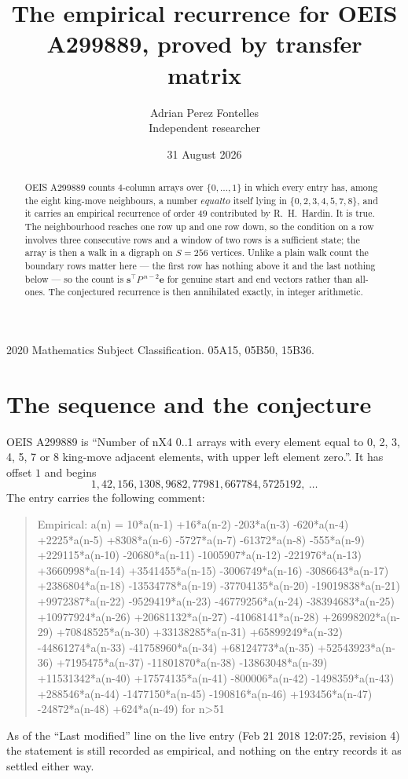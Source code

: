 \documentclass[11pt,a4paper]{article}
\title{The empirical recurrence for OEIS A299889, proved by transfer matrix}
\author{Adrian Perez Fontelles\\ \small Independent researcher}
\date{31 August 2026}
\theoremstyle{plain}
\theoremstyle{definition}
\begin{document}
\maketitle

\begin{abstract}
OEIS A299889 counts $4$-column arrays over $\{0,\dots,1\}$ in which every entry has,
among the eight king-move neighbours, a number $equal to$ itself lying in $\{0,2,3,4,5,7,8\}$, and it carries an empirical
recurrence of order $49$ contributed by R.~H.~Hardin. It is true. The neighbourhood
reaches one row up and one row down, so the condition on a row involves three consecutive
rows and a window of two rows is a sufficient state; the array is then a walk in a digraph
on $S=256$ vertices. Unlike a plain walk count the boundary rows matter here --- the first
row has nothing above it and the last nothing below --- so the count is
$\mathbf{s}^{\!\top}P^{\,n-2}\mathbf{e}$ for genuine start and end vectors rather than
all-ones. The conjectured recurrence is then annihilated exactly, in integer arithmetic.
\end{abstract}

\noindent\small 2020 Mathematics Subject Classification. 05A15, 05B50, 15B36.\normalsize

\section{The sequence and the conjecture}

OEIS A299889 is ``Number of nX4 0..1 arrays with every element equal to 0, 2, 3, 4, 5, 7 or 8 king-move adjacent elements, with upper left element zero.''. It has offset
$1$ and begins
\[
1, 42, 156, 1308, 9682, 77981, 667784, 5725192,\ \dots
\]
The entry carries the following comment:
\begin{quote}\small
Empirical: a(n) = 10*a(n-1) +16*a(n-2) -203*a(n-3) -620*a(n-4) +2225*a(n-5) +8308*a(n-6) -5727*a(n-7) -61372*a(n-8) -555*a(n-9) +229115*a(n-10) -20680*a(n-11) -1005907*a(n-12) -221976*a(n-13) +3660998*a(n-14) +3541455*a(n-15) -3006749*a(n-16) -3086643*a(n-17) +2386804*a(n-18) -13534778*a(n-19) -37704135*a(n-20) -19019838*a(n-21) +9972387*a(n-22) -9529419*a(n-23) -46779256*a(n-24) -38394683*a(n-25) +10977924*a(n-26) +20681132*a(n-27) -41068141*a(n-28) +26998202*a(n-29) +70848525*a(n-30) +33138285*a(n-31) +65899249*a(n-32) -44861274*a(n-33) -41758960*a(n-34) +68124773*a(n-35) +52543923*a(n-36) +7195475*a(n-37) -11801870*a(n-38) -13863048*a(n-39) +11531342*a(n-40) +17574135*a(n-41) -800006*a(n-42) -1498359*a(n-43) +288546*a(n-44) -1477150*a(n-45) -190816*a(n-46) +193456*a(n-47) -24872*a(n-48) +624*a(n-49) for n>51
\end{quote}
As of the ``Last modified'' line on the live entry (Feb 21 2018 12:07:25, revision
4) the statement is still recorded as empirical, and nothing on the entry
records it as settled either way.
\end{document}

